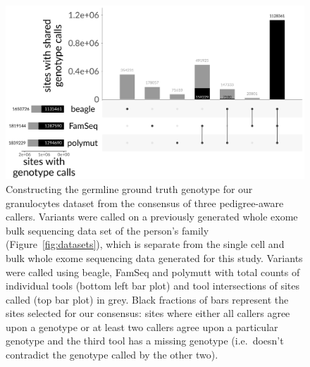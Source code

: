 \documentclass[authoryear,preprint,11pt]{scrartcl}
\begin{document}
\begin{figure}[!tpb]
  \includegraphics[width=\linewidth]{figs/Laehnemann2017/ground_truth/Hoell2014_pedigree_consensus_calling.pdf}
 \caption{
   Constructing the germline ground truth genotype for our granulocytes dataset from the consensus of three pedigree-aware callers.
   Variants were called on a previously generated whole exome bulk sequencing data set of the person's family (Figure~\ref{fig:datasets}), which is separate from the single cell and bulk whole exome sequencing data generated for this study.
   Variants were called using beagle, FamSeq and polymutt with total counts of individual tools (bottom left bar plot) and tool intersections of sites called (top bar plot) in grey.
   Black fractions of bars represent the sites selected for our consensus: sites where either all callers agree upon a genotype or at least two callers agree upon a particular genotype and the third tool has a missing genotype (i.e.~doesn't contradict the genotype called by the other two).
 }
\label{fig:granulocytes-ground-truth}
\end{figure}
\end{document}
